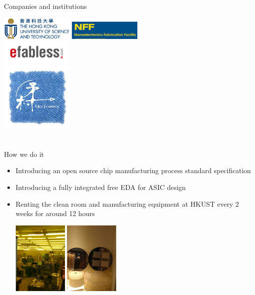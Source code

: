 \documentclass[9pt]{beamer}
\begin{document}
\begin{frame}{Companies and institutions}
	\begin{center}
		\includegraphics[width=100pt]{HKUST_Logo.png}
		\includegraphics[width=100pt]{NFF.jpg}  \\
		\includegraphics[width=100pt]{efabless_logo.png} \\
		\includegraphics[width=100pt]{Lanceville.png}
	\end{center}
\end{frame}

\section[How]{}
\begin{frame}{How we do it}
	\begin{itemize}
		\item Introducing an open source chip manufacturing process standard specification
		\item Introducing a fully integrated free EDA for ASIC design\footnotemark
		\item Renting the clean room and manufacturing equipment at HKUST every 2 weeks for around 12 hours \\		
		\begin{center}
			\includegraphics[height=100pt]{cleanroom.png}
			\includegraphics[height=100pt]{examples.png}
		\end{center}
	\end{itemize}

\end{frame}
\end{document}
